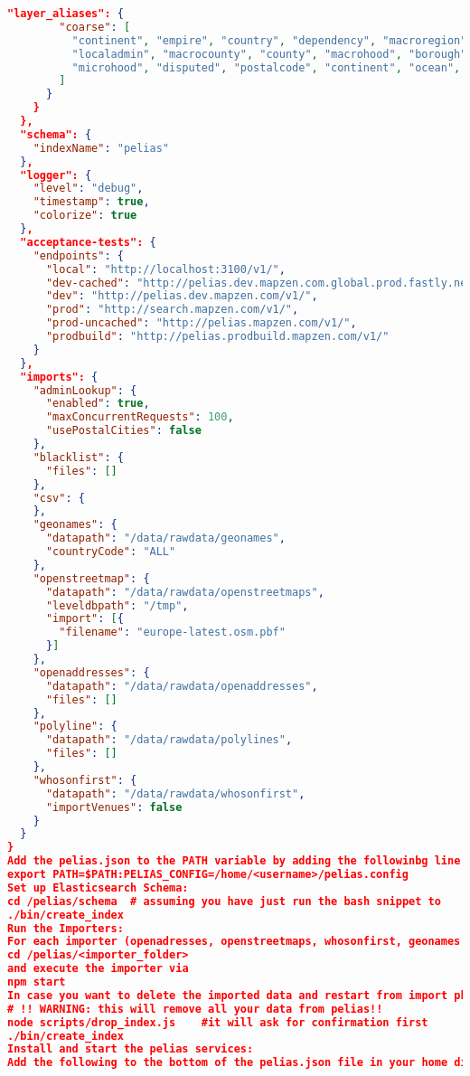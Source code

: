\begin{lstlisting}[language=json,breaklines=true]
      "layer_aliases": {
        "coarse": [
          "continent", "empire", "country", "dependency", "macroregion", "region", "locality",
          "localadmin", "macrocounty", "county", "macrohood", "borough", "neighbourhood",
          "microhood", "disputed", "postalcode", "continent", "ocean", "marinearea"
        ]
      }
    }
  },
  "schema": {
    "indexName": "pelias"
  },
  "logger": {
    "level": "debug",
    "timestamp": true,
    "colorize": true
  },
  "acceptance-tests": {
    "endpoints": {
      "local": "http://localhost:3100/v1/",
      "dev-cached": "http://pelias.dev.mapzen.com.global.prod.fastly.net/v1/",
      "dev": "http://pelias.dev.mapzen.com/v1/",
      "prod": "http://search.mapzen.com/v1/",
      "prod-uncached": "http://pelias.mapzen.com/v1/",
      "prodbuild": "http://pelias.prodbuild.mapzen.com/v1/"
    }
  },
  "imports": {
    "adminLookup": {
      "enabled": true,
      "maxConcurrentRequests": 100,
      "usePostalCities": false
    },
    "blacklist": {
      "files": []
    },
    "csv": {
    },
    "geonames": {
      "datapath": "/data/rawdata/geonames",
      "countryCode": "ALL"
    },
    "openstreetmap": {
      "datapath": "/data/rawdata/openstreetmaps",
      "leveldbpath": "/tmp",
      "import": [{
        "filename": "europe-latest.osm.pbf"
      }]
    },
    "openaddresses": {
      "datapath": "/data/rawdata/openaddresses",
      "files": []
    },
    "polyline": {
      "datapath": "/data/rawdata/polylines",
      "files": []
    },
    "whosonfirst": {
      "datapath": "/data/rawdata/whosonfirst",
      "importVenues": false
    }
  }
}
Add the pelias.json to the PATH variable by adding the followinbg line at the bottom of the .bashrc-file:
export PATH=$PATH:PELIAS_CONFIG=/home/<username>/pelias.config
Set up Elasticsearch Schema:
cd /pelias/schema  # assuming you have just run the bash snippet to 			  download the repos from earlier
./bin/create_index
Run the Importers:
For each importer (openadresses, openstreetmaps, whosonfirst, geonames and polylines) navigate into their folders under 
cd /pelias/<importer_folder>
and execute the importer via 
npm start
In case you want to delete the imported data and restart from import phase, run the following:
# !! WARNING: this will remove all your data from pelias!!
node scripts/drop_index.js    #it will ask for confirmation first
./bin/create_index
Install and start the pelias services:
Add the following to the bottom of the pelias.json file in your home directory. This will tell the pelias API to use all the services running locally and on their default ports.

\end{lstlisting}
